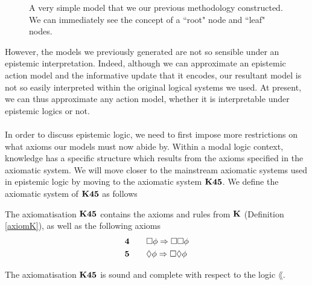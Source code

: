 \begin{figure}
\centering
{}
\caption[Example of constructions in $\AXK$]{A very simple model that we our previous methodology constructed.
We can immediately see the concept of a ``root" node and ``leaf" nodes.}
\label{exampleModelConstruct}
\end{figure}

However, the models we previously generated are not so sensible under an epistemic interpretation.
Indeed, although we can approximate an epistemic action model and the informative update that it
encodes, our resultant model is not so easily interpreted within the original logical systems we
used.
At present, we can thus approximate any action model, whether it is interpretable under epistemic
logics or not.\\
\\
In order to discuss epistemic logic, we need to first impose more restrictions on what axioms our
models must now abide by.
Within a modal logic context, knowledge has a specific structure which results from the axioms
specified in the axiomatic system.
We will move closer to the mainstream axiomatic systems used in epistemic logic by moving to the
axiomatic system $\bf K45$.
We define the axiomatic system of $\bf K45$ as follows

\begin{defn} \label{axiomK45}
The axiomatisation $\bf K45$ contains the axioms and rules from $\AXK$ (Definition
    \ref{axiomK}), as well as the following axioms
\begin{alignat*}{2}
  & \bf 4 && \quad \Box \phi \Rightarrow \Box \Box \phi \\
  & \bf 5 && \quad \Diamond \phi \Rightarrow \Box \Diamond \phi
\end{alignat*}
\end{defn}

\begin{lemma} \label{axiomK45SoundComplete}
The axiomatisation $\bf K45$ is sound and complete with respect to the logic
$\lang$.
\end{lemma}

